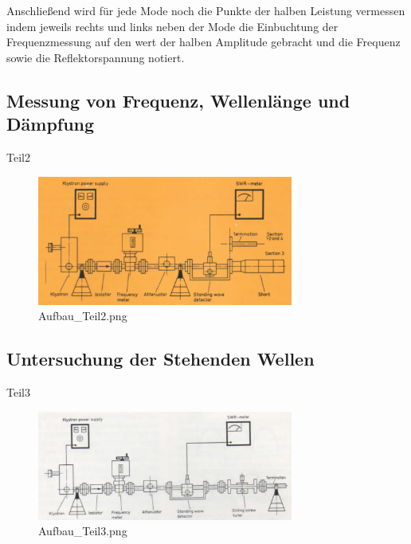         Anschließend wird für jede Mode noch die Punkte der halben Leistung vermessen indem jeweils rechts und links neben der Mode die Einbuchtung der Frequenzmessung auf den wert der halben Amplitude gebracht und die Frequenz sowie die Reflektorspannung notiert.
    \subsection{Messung von Frequenz, Wellenlänge und Dämpfung}
        Teil2
        \begin{figure}[H]
            \centering
            \includegraphics[width = 0.75\textwidth]{bilder/Aufbau_Teil2.png}
            \caption{Aufbau\_Teil2.png}
            \label{fig:Teil2}
        \end{figure}
    \subsection{Untersuchung der Stehenden Wellen}
        Teil3
        \begin{figure}[H]
            \centering
            \includegraphics[width = 0.75\textwidth]{bilder/Aufbau_Teil3.png}
            \caption{Aufbau\_Teil3.png}
            \label{fig:Teil3}
        \end{figure}